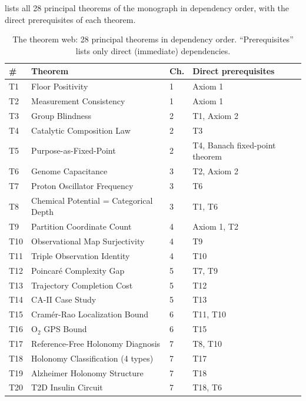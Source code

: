  lists all 28 principal theorems of the monograph
in dependency order, with the direct prerequisites of each theorem.

\begin{table}[!htbp]
\centering
\small
\caption{The theorem web: 28 principal theorems in dependency order.
``Prerequisites'' lists only direct (immediate) dependencies.}
\label{tab:ch11-theorem-web}
\renewcommand{\arraystretch}{1.12}
\begin{tabular}{@{}p{0.4cm}p{3.2cm}p{0.4cm}p{5.8cm}@{}}
\toprule
\# & Theorem & Ch. & Direct prerequisites \\
\midrule
T1  & Floor Positivity                  & 1  & Axiom 1 \\
T2  & Measurement Consistency           & 1  & Axiom 1 \\
T3  & Group Blindness                   & 2  & T1, Axiom 2 \\
T4  & Catalytic Composition Law         & 2  & T3 \\
T5  & Purpose-as-Fixed-Point            & 2  & T4, Banach fixed-point theorem \\
T6  & Genome Capacitance                & 3  & T2, Axiom 2 \\
T7  & Proton Oscillator Frequency       & 3  & T6 \\
T8  & Chemical Potential = Categorical Depth & 3 & T1, T6 \\
T9  & Partition Coordinate Count        & 4  & Axiom 1, T2 \\
T10 & Observational Map Surjectivity    & 4  & T9 \\
T11 & Triple Observation Identity       & 4  & T10 \\
T12 & Poincaré Complexity Gap           & 5  & T7, T9 \\
T13 & Trajectory Completion Cost        & 5  & T12 \\
T14 & CA-II Case Study                  & 5  & T13 \\
T15 & Cramér-Rao Localization Bound     & 6  & T11, T10 \\
T16 & O$_2$ GPS Bound                   & 6  & T15 \\
T17 & Reference-Free Holonomy Diagnosis & 7  & T8, T10 \\
T18 & Holonomy Classification (4 types) & 7  & T17 \\
T19 & Alzheimer Holonomy Structure      & 7  & T18 \\
T20 & T2D Insulin Circuit               & 7  & T18, T6 \\

\end{tabular}
\end{table}
